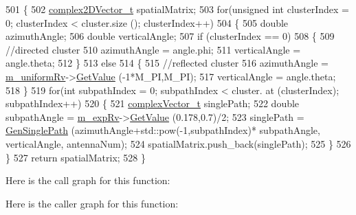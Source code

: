 \begin{DoxyCode}
501 \{
502         \hyperlink{namespacens3_aa25e3feece2676fd7470d50d4ba3d1d1}{complex2DVector\_t} spatialMatrix;
503         \textcolor{keywordflow}{for}(\textcolor{keywordtype}{unsigned} \textcolor{keywordtype}{int} clusterIndex = 0; clusterIndex < cluster.size (); clusterIndex++)
504         \{
505                 \textcolor{keywordtype}{double} azimuthAngle;
506                 \textcolor{keywordtype}{double} verticalAngle;
507                 \textcolor{keywordflow}{if} (clusterIndex == 0)
508                 \{
509                         \textcolor{comment}{//directed cluster}
510                         azimuthAngle = angle.phi;
511                         verticalAngle = angle.theta;
512                 \}
513                 \textcolor{keywordflow}{else}
514                 \{
515                         \textcolor{comment}{//reflected cluster}
516                         azimuthAngle = \hyperlink{classns3_1_1MmWaveChannelMatrix_a914afe40a958ddccd64a99f86190be0c}{m\_uniformRv}->\hyperlink{classns3_1_1UniformRandomVariable_a03822d8c86ac51e9aa83bbc73041386b}{GetValue} (-1*M\_PI,M\_PI);
517                         verticalAngle = angle.theta;
518                 \}
519                 \textcolor{keywordflow}{for}(\textcolor{keywordtype}{int} subpathIndex = 0; subpathIndex < cluster. at (clusterIndex); subpathIndex++)
520                 \{
521                         \hyperlink{namespacens3_a6a7f75817ae50e6ac47414955b17d926}{complexVector\_t} singlePath;
522                         \textcolor{keywordtype}{double} subpathAngle = \hyperlink{classns3_1_1MmWaveChannelMatrix_a7fee3ea2f2e3812df87e63e3baa743d0}{m\_expRv}->\hyperlink{classns3_1_1ExponentialRandomVariable_a5d7a50466c0b0f036ec0fc1aa478f2c3}{GetValue} (0.178,0.7)/2;
523                         singlePath = \hyperlink{classns3_1_1MmWaveChannelMatrix_ae034ee8262dacddc18427ddbf21cb84b}{GenSinglePath} (azimuthAngle+std::pow(-1,subpathIndex)*
      subpathAngle, verticalAngle, antennaNum);
524                         spatialMatrix.push\_back(singlePath);
525                 \}
526         \}
527         \textcolor{keywordflow}{return} spatialMatrix;
528 \}
\end{DoxyCode}


Here is the call graph for this function\+:




Here is the caller graph for this function\+:


